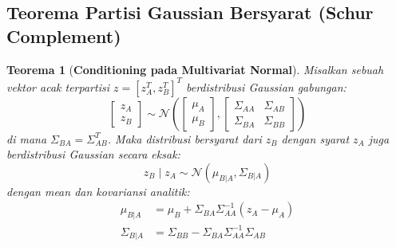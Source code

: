 \documentclass[11pt,a4paper]{article}
\def\boldsymbol#1{#1}%
\def\mathbf#1{#1}%
\newtheorem{teorema}{Teorema}[section]
\begin{document}
\subsection{Teorema Partisi Gaussian Bersyarat (Schur Complement)}
\begin{teorema}[\textbf{Conditioning pada Multivariat Normal}]
\label{thm:conditioning}
Misalkan sebuah vektor acak terpartisi $\mathbf{z} = [\mathbf{z}_A^T, \mathbf{z}_B^T]^T$ berdistribusi Gaussian gabungan:
\begin{equation}
\begin{bmatrix} \mathbf{z}_A \\ \mathbf{z}_B \end{bmatrix} \sim \mathcal{N}\left(
\begin{bmatrix} \boldsymbol{\mu}_A \\ \boldsymbol{\mu}_B \end{bmatrix},
\begin{bmatrix} \Sigma_{AA} & \Sigma_{AB} \\ \Sigma_{BA} & \Sigma_{BB} \end{bmatrix}
\right)
\end{equation}
di mana $\Sigma_{BA} = \Sigma_{AB}^T$. Maka distribusi bersyarat dari $\mathbf{z}_B$ dengan syarat $\mathbf{z}_A$ juga berdistribusi Gaussian secara eksak:
\begin{equation}
\mathbf{z}_B \mid \mathbf{z}_A \sim \mathcal{N}(\boldsymbol{\mu}_{B|A}, \Sigma_{B|A})
\end{equation}
dengan mean dan kovariansi analitik:
\begin{align}
\boldsymbol{\mu}_{B|A} &= \boldsymbol{\mu}_B + \Sigma_{BA} \Sigma_{AA}^{-1} (\mathbf{z}_A - \boldsymbol{\mu}_A) \\
\Sigma_{B|A} &= \Sigma_{BB} - \Sigma_{BA} \Sigma_{AA}^{-1} \Sigma_{AB}
\end{align}
\end{teorema}
\end{document}
